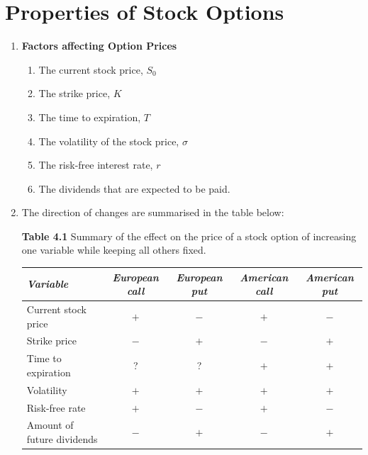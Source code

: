
\section{Properties of Stock Options}

\begin{enumerate}
    \item \textbf{Factors affecting Option Prices}
    \begin{enumerate}
        \item The current stock price, $S_0$
        \item The strike price, $K$
        \item The time to expiration, $T$
        \item The volatility of the stock price, $\sigma$
        \item The risk-free interest rate, $r$
        \item The dividends that are expected to be paid.
    \end{enumerate}
    \item The direction of changes are summarised in the table below:
    
        \begin{table}[h]
        \textbf{Table 4.1} Summary of the effect on the price of a stock option of
        increasing one variable while keeping all others fixed.

        \vspace{0.5em}
        \begin{tabular}{lcccc}
        \hline\hline
        \textit{Variable} & \textit{European call} & \textit{European put} & \textit{American call} & \textit{American put} \\
        \hline
        Current stock price       & $+$ & $-$ & $+$ & $-$ \\
        Strike price              & $-$ & $+$ & $-$ & $+$ \\
        Time to expiration        & ?   & ?   & $+$ & $+$ \\
        Volatility                & $+$ & $+$ & $+$ & $+$ \\
        Risk-free rate            & $+$ & $-$ & $+$ & $-$ \\
        Amount of future dividends & $-$ & $+$ & $-$ & $+$ \\
        \hline\hline
        \end{tabular}

        \vspace{0.5em}
        \begin{minipage}{\linewidth}
        \small


\end{minipage}
\end{table}
\end{enumerate}
